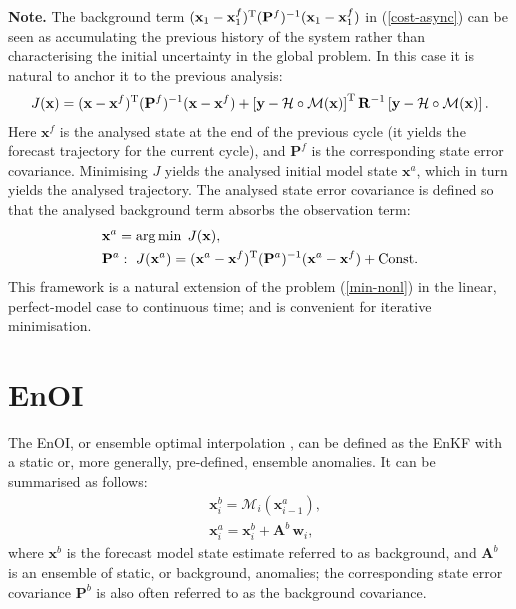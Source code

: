 \documentclass[11pt]{report}
\newcommand{\mb} {\mathbf}
\newcommand{\T}{^{\tiny \mathrm T}}
\begin{document}
{
  \setlength{\abovedisplayskip}{2pt}
  \setlength{\belowdisplayskip}{2pt}
  \scriptsize
  {\bf Note.} The background term $(\mb x_1 - \mb x_1^f)\T (\mb P^f)^{-1} (\mb x_1 - \mb x_1^f)$ in (\ref{cost-async}) can be seen as accumulating the previous history of the system rather than characterising the initial uncertainty in the global problem.
  In this case it is natural to anchor it to the previous analysis:
  \begin{align}
    J(\mb x) = (\mb x - \mb x^f)\T (\mb P^f)^{-1} (\mb x - \mb x^f) + \left [ \mb y - \mathcal H \circ \mathcal M(\mb x) \right ] \T \mb R^{-1} \left [ \mb y - \mathcal H \circ \mathcal M(\mb x) \right ].
  \end{align}
  Here $\mb x^f$ is the analysed state at the end of the previous cycle (it yields the forecast trajectory for the current cycle), and $\mb P^f$ is the corresponding state error covariance.
  Minimising $J$ yields the analysed initial model state $\mb x^a$, which in turn yields the analysed trajectory.
  The analysed state error covariance is defined so that the analysed background term absorbs the observation term:
  \begin{align*}
    &\mb x^a = \arg \min \; J(\mb x),\\
    &\mb P^a: \ J(\mb x^a) = (\mb x^a - \mb x^f)\T (\mb P^a)^{-1} (\mb x^a - \mb x^f) + \mathrm{Const}.
  \end{align*}
  This framework is a natural extension of the problem (\ref{min-nonl}) in the linear, perfect-model case to continuous time; and is convenient for iterative minimisation.\par
}

\section{EnOI}

The EnOI, or ensemble optimal interpolation \citep{eve03a}, can be defined as the EnKF with a static or, more generally, pre-defined, ensemble anomalies.
It can be summarised as follows:
\begin{align}
  \label{enoi-for}
  & \mb x^b_i = \mathcal M_i(\mb x^a_{i-1}),\\
  & \mb x^a_i = \mb x^b_i + \mb A^b \, \mb w_i,
\end{align}
where $\mb x^b$ is the forecast model state estimate referred to as background, and $\mb A^b$ is an ensemble of static, or background, anomalies; the corresponding state error covariance $\mb P^b$ is also often referred to as the background covariance.
\end{document}
